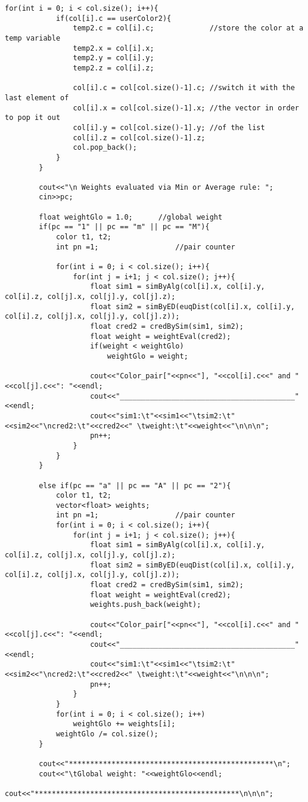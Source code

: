 \begin{lstlisting}[caption=The C++ implementation of the application concerning colors, breaklines=true]
		for(int i = 0; i < col.size(); i++){
			if(col[i].c == userColor2){
				temp2.c = col[i].c;				//store the color at a temp variable
				temp2.x = col[i].x;
				temp2.y = col[i].y;
				temp2.z = col[i].z;

				col[i].c = col[col.size()-1].c;	//switch it with the last element of
				col[i].x = col[col.size()-1].x;	//the vector in order to pop it out
				col[i].y = col[col.size()-1].y;	//of the list
				col[i].z = col[col.size()-1].z;
				col.pop_back();
			}
		}

		cout<<"\n Weights evaluated via Min or Average rule: ";
		cin>>pc;

		float weightGlo = 1.0;		//global weight
		if(pc == "1" || pc == "m" || pc == "M"){
			color t1, t2;
			int pn =1;					//pair counter

			for(int i = 0; i < col.size(); i++){
				for(int j = i+1; j < col.size(); j++){
					float sim1 = simByAlg(col[i].x, col[i].y, col[i].z, col[j].x, col[j].y, col[j].z);
					float sim2 = simByED(euqDist(col[i].x, col[i].y, col[i].z, col[j].x, col[j].y, col[j].z));
					float cred2 = credBySim(sim1, sim2);
					float weight = weightEval(cred2);
					if(weight < weightGlo)
						weightGlo = weight;

					cout<<"Color_pair["<<pn<<"], "<<col[i].c<<" and "<<col[j].c<<": "<<endl;
					cout<<"_________________________________________"<<endl;
					cout<<"sim1:\t"<<sim1<<"\tsim2:\t"<<sim2<<"\ncred2:\t"<<cred2<<" \tweight:\t"<<weight<<"\n\n\n";
					pn++;
				}
			}
		}

		else if(pc == "a" || pc == "A" || pc == "2"){
			color t1, t2;
			vector<float> weights;
			int pn =1;					//pair counter
			for(int i = 0; i < col.size(); i++){
				for(int j = i+1; j < col.size(); j++){
					float sim1 = simByAlg(col[i].x, col[i].y, col[i].z, col[j].x, col[j].y, col[j].z);
					float sim2 = simByED(euqDist(col[i].x, col[i].y, col[i].z, col[j].x, col[j].y, col[j].z));
					float cred2 = credBySim(sim1, sim2);
					float weight = weightEval(cred2);
					weights.push_back(weight);

					cout<<"Color_pair["<<pn<<"], "<<col[i].c<<" and "<<col[j].c<<": "<<endl;
					cout<<"_________________________________________"<<endl;
					cout<<"sim1:\t"<<sim1<<"\tsim2:\t"<<sim2<<"\ncred2:\t"<<cred2<<" \tweight:\t"<<weight<<"\n\n\n";
					pn++;
				}
			}
			for(int i = 0; i < col.size(); i++)
				weightGlo += weights[i];
			weightGlo /= col.size();
		}

		cout<<"************************************************\n";
		cout<<"\tGlobal weight: "<<weightGlo<<endl;
		cout<<"************************************************\n\n\n";


\end{lstlisting}
